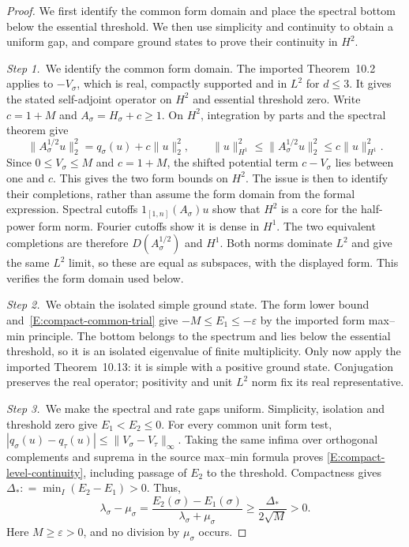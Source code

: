 \begin{proof}
  We first identify the common form domain and place the spectral bottom below
  the essential threshold. We then use simplicity and continuity to obtain a
  uniform gap, and compare ground states to prove their continuity in $H^2$.

  \medskip
  \noindent\textit{Step 1.~}We identify the common form domain.
  The imported Theorem~10.2 applies to $-V_\sigma$, which is real, compactly
  supported and in $L^2$ for $d \le 3$. It gives the stated self-adjoint
  operator on $H^2$ and essential threshold zero. Write $c = 1+M$ and $A_\sigma
  = H_\sigma+c \ge 1$. On $H^2$, integration by parts and the spectral theorem
  give
  \[
    \|A_\sigma^{1/2}u\|_2^2
    =q_\sigma(u)+c\|u\|_2^2,\qquad
    \|u\|_{H^1}^2\le\|A_\sigma^{1/2}u\|_2^2
    \le c\|u\|_{H^1}^2.
  \]
  Since $0 \le V_\sigma \le M$ and $c = 1+M$, the shifted potential term
  $c-V_\sigma$ lies between one and $c$. This gives the two form bounds on
  $H^2$. The issue is then to identify their completions, rather than assume
  the form domain from the formal expression.
  Spectral cutoffs $1_{[1,n]}(A_\sigma)u$ show that $H^2$ is a core for the
  half-power form norm. Fourier cutoffs show it is dense in $H^1$. The two
  equivalent completions are therefore $D(A_\sigma^{1/2})$ and $H^1$. Both norms
  dominate $L^2$ and give the same $L^2$ limit, so these are equal as subspaces,
  with the displayed form. This verifies the form domain used below.

  \medskip
  \noindent\textit{Step 2.~}We obtain the isolated simple ground state.
  The form lower bound and~\eqref{E:compact-common-trial} give $-M \le E_1 \le
  -\varepsilon$ by the imported form max--min principle. The bottom belongs to
  the spectrum and lies below the essential threshold, so it is an isolated
  eigenvalue of finite multiplicity. Only now apply the imported Theorem~10.13:
  it is simple with a positive ground state. Conjugation preserves the real
  operator; positivity and unit $L^2$ norm fix its real representative.

  \medskip
  \noindent\textit{Step 3.~}We make the spectral and rate gaps uniform.
  Simplicity, isolation and threshold zero give $E_1 < E_2 \le 0$. For every
  common unit form test, $|q_\sigma(u)-q_\tau(u)| \le
  \|V_\sigma-V_\tau\|_\infty$. Taking the same infima over orthogonal
  complements and suprema in the source max--min formula proves
  \eqref{E:compact-level-continuity}, including passage of $E_2$ to the
  threshold. Compactness gives $\Delta_*: = \min_I(E_2-E_1) > 0$. Thus,
  \[
    \lambda_\sigma-\mu_\sigma
    =\frac{E_2(\sigma)-E_1(\sigma)}
    {\lambda_\sigma+\mu_\sigma}
    \ge\frac{\Delta_*}{2\sqrt M}>0.
  \]
  Here $M \ge \varepsilon > 0$, and no division by $\mu_\sigma$ occurs.


\end{proof}
